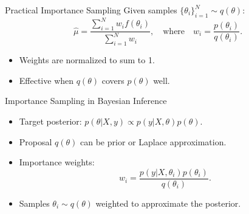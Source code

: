 \documentclass{beamer}
\begin{document}
\begin{frame}{Practical Importance Sampling}
Given samples \(\{\theta_i\}_{i=1}^N \sim q(\theta)\):
\[
\hat{\mu} = \frac{\sum_{i=1}^N w_i f(\theta_i)}{\sum_{i=1}^N w_i}, \quad \text{where} \quad w_i = \frac{p(\theta_i)}{q(\theta_i)}.
\]
\begin{itemize}
    \item Weights are normalized to sum to 1.
    \item Effective when \( q(\theta) \) covers \( p(\theta) \) well.
\end{itemize}
\end{frame}

\begin{frame}{Importance Sampling in Bayesian Inference}
\begin{itemize}
    \item Target posterior: \( p(\theta | X, y) \propto p(y | X, \theta) p(\theta) \).
    \item Proposal \( q(\theta) \) can be prior or Laplace approximation.
    \item Importance weights:
\[
w_i = \frac{p(y | X, \theta_i) p(\theta_i)}{q(\theta_i)}.
\]
    \item Samples \(\theta_i \sim q(\theta)\) weighted to approximate the posterior.
\end{itemize}
\end{frame}
\end{document}
